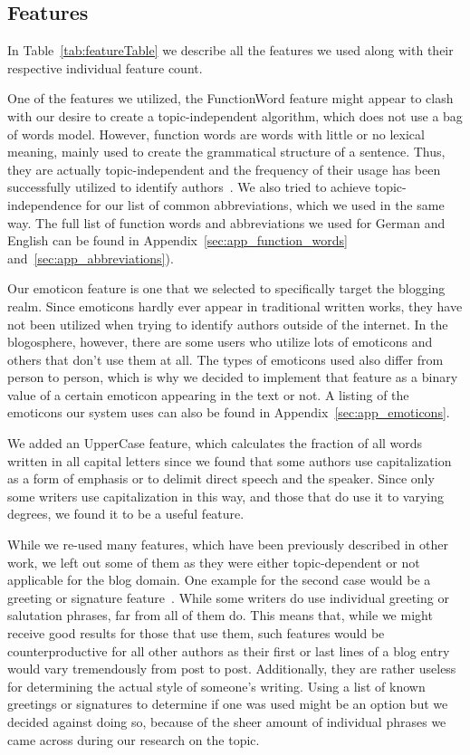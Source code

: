 \subsection{Features}
\label{sec:impl_features}

In Table~\ref{tab:featureTable} we describe all the features we used along with their respective individual feature count.


One of the features we utilized, the FunctionWord feature might appear to clash with our desire to create a topic-independent algorithm, which does not use a bag of words model.
However, function words are words with little or no lexical meaning, mainly used to create the grammatical structure of a sentence.
Thus, they are actually topic-independent and the frequency of their usage has been successfully utilized to identify authors~\cite{mosteller1962applied}.
We also tried to achieve topic-independence for our list of common abbreviations, which we used in the same way.
The full list of function words and abbreviations we used for German and English can be found in Appendix~\ref{sec:app_function_words} and~\ref{sec:app_abbreviations}).


Our emoticon feature is one that we selected to specifically target the blogging realm.
Since emoticons hardly ever appear in traditional written works, they have not been utilized when trying to identify authors outside of the internet.
In the blogosphere, however, there are some users who utilize lots of emoticons and others that don't use them at all.
The types of emoticons used also differ from person to person, which is why we decided to implement that feature as a binary value of a certain emoticon appearing in the text or not.
A listing of the emoticons our system uses can also be found in Appendix~\ref{sec:app_emoticons}.


We added an UpperCase feature, which calculates the fraction of all words written in all capital letters since we found that some authors use capitalization as a form of emphasis or to delimit direct speech and the speaker.
Since only some writers use capitalization in this way, and those that do use it to varying degrees, we found it to be a useful feature.


While we re-used many features, which have been previously described in other work, we left out some of them as they were either topic-dependent or not applicable for the blog domain.
One example for the second case would be a greeting or signature feature~\cite{de2001mining}.
While some writers do use individual greeting or salutation phrases, far from all of them do.
This means that, while we might receive good results for those that use them, such features would be counterproductive for all other authors as their first or last lines of a blog entry would vary tremendously from post to post.
Additionally, they are rather useless for determining the actual style of someone's writing.
Using a list of known greetings or signatures to determine if one was used might be an option but we decided against doing so, because of the sheer amount of individual phrases we came across during our research on the topic.


